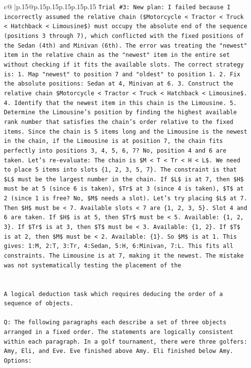 \documentclass{article}
\begin{document}
{\begin{supertabular}{c@{$\;$}|p{.15\linewidth}@{}p{.15\linewidth}p{.15\linewidth}p{.15\linewidth}p{.15\linewidth}p{.15\linewidth}}
{{{\texttt{Trial \#3: New plan: I failed because I incorrectly assumed the relative chain (\$Motorcycle < Tractor < Truck < Hatchback < Limousine\$) must occupy the absolute end of the sequence (positions 3 through 7), which conflicted with the fixed positions of the Sedan (4th) and Minivan (6th). The error was treating the "newest" item in the relative chain as the "newest" item in the entire set without checking if it fits the available slots. The correct strategy is: 1. Map "newest" to position 7 and "oldest" to position 1. 2. Fix the absolute positions: Sedan at 4, Minivan at 6. 3. Construct the relative chain \$Motorcycle < Tractor < Truck < Hatchback < Limousine\$. 4. Identify that the newest item in this chain is the Limousine. 5. Determine the Limousine's position by finding the highest available rank number that satisfies the chain's order relative to the fixed items. Since the chain is 5 items long and the Limousine is the newest in the chain, if the Limousine is at position 7, the chain fits perfectly into positions 3, 4, 5, 6, 7? No, position 4 and 6 are taken. Let's re{-}evaluate: The chain is \$M < T < Tr < H < L\$. We need to place 5 items into slots \{1, 2, 3, 5, 7\}. The constraint is that \$L\$ must be the largest number in the chain. If \$L\$ is at 7, then \$H\$ must be at 5 (since 6 is taken), \$Tr\$ at 3 (since 4 is taken), \$T\$ at 2 (since 1 is free? No, \$M\$ needs a slot). Let's try placing \$L\$ at 7. Then \$H\$ must be < 7. Available slots < 7 are \{1, 2, 3, 5\}. Slot 4 and 6 are taken. If \$H\$ is at 5, then \$Tr\$ must be < 5. Available: \{1, 2, 3\}. If \$Tr\$ is at 3, then \$T\$ must be < 3. Available: \{1, 2\}. If \$T\$ is at 2, then \$M\$ must be < 2. Available: \{1\}. So \$M\$ is at 1. This gives: 1:M, 2:T, 3:Tr, 4:Sedan, 5:H, 6:Minivan, 7:L. This fits all constraints. The Limousine is at 7, making it the newest. The mistake was not systematically testing the placement of the} \\
\\ 
\\ 
\texttt{A logical deduction task which requires deducing the order of a sequence of objects.} \\
\\ 
\texttt{Q: The following paragraphs each describe a set of three objects arranged in a fixed order. The statements are logically consistent within each paragraph. In a golf tournament, there were three golfers: Amy, Eli, and Eve. Eve finished above Amy. Eli finished below Amy.} \\
\texttt{Options:} \\
}}}
\end{supertabular}}
\end{document}
